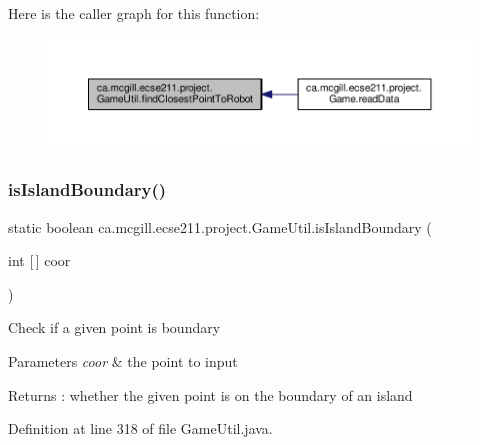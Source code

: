 Here is the caller graph for this function\+:
\nopagebreak
\begin{figure}[H]
\begin{center}
\leavevmode
\includegraphics[width=350pt]{classca_1_1mcgill_1_1ecse211_1_1project_1_1_game_util_a6e0ee94b800ca3727ca8009782abda14_icgraph}
\end{center}
\end{figure}
\mbox{\label{classca_1_1mcgill_1_1ecse211_1_1project_1_1_game_util_a5783c3415e13b66362a647504b63741a}} 
\subsubsection{\texorpdfstring{is\+Island\+Boundary()}{isIslandBoundary()}}
{\footnotesize\ttfamily static boolean ca.\+mcgill.\+ecse211.\+project.\+Game\+Util.\+is\+Island\+Boundary (\begin{DoxyParamCaption}\item[{int \mbox{[}$\,$\mbox{]}}]{coor }\end{DoxyParamCaption})\hspace{0.3cm}{\ttfamily [static]}}

Check if a given point is boundary 
\begin{DoxyParams}{Parameters}
{\em coor} & the point to input \\
\hline
\end{DoxyParams}
\begin{DoxyReturn}{Returns}
\+: whether the given point is on the boundary of an island 
\end{DoxyReturn}


Definition at line 318 of file Game\+Util.\+java.



